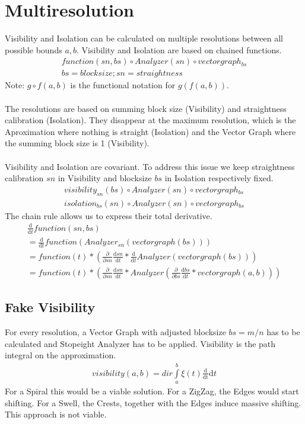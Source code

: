 \documentclass{report}
\begin{document}
\chapter{Multiresolution}
Visibility and Isolation can be calculated on multiple resolutions between all possible bounds $a,b$.
Visibility and Isolation are based on chained functions.
\begin{align*}
function(sn,bs) \circ Analyzer(sn) \circ vectorgraph_{bs}\\
bs=blocksize;sn=straightness
\end{align*}
Note: $g \circ f(a,b)$ is the functional notation for $g(f(a,b))$.\\\\
The resolutions are based on summing block size (Visibility) and straightness calibration (Isolation). They disappear at the maximum resolution, which is the Aproximation where nothing is straight (Isolation) and the Vector Graph where the summing block size is 1 (Visibility).\\\\
Visibility and Isolation are covariant. To address this issue we keep straightness calibration $sn$ in Visibility and blocksize $bs$ in Isolation respectively fixed.
\begin{align}
visibility_{sn}(bs) \circ Analyzer(sn) \circ vectorgraph_{bs}\\
isolation_{bs}(sn) \circ Analyzer(sn) \circ vectorgraph_{bs}
\end{align}
The chain rule allows us to express their total derivative.
\begin{align}
\frac{\mathrm{d}}{\mathrm{d} t} function (sn,bs)\\
= \frac{\mathrm{d}}{\mathrm{d} t} function (Analyzer_{sn}(vectorgraph(bs)))\\
= function(t)* (\frac{\partial}{\partial sn}  \frac{\mathrm{d} sn}{\mathrm{d}t} * \frac{\mathrm{d}}{\mathrm{d} t}Analyzer(vectorgraph(bs)))\\
= function(t)* (\frac{\partial}{\partial sn}  \frac{\mathrm{d} sn}{\mathrm{d}t} * Analyzer(\frac{\partial}{\partial bs} \frac{\mathrm{d} bs}{\mathrm{d}t}*vectorgraph(a,b)))
\end{align}

\section{Fake Visibility}
For every resolution, a Vector Graph with adjusted blocksize $bs=m/n$ has to be calculated and Stopeight Analyzer has to be applied.
Visibility is the path integral on the approximation.
\begin{align}
visibility(a,b)= dir \int \limits _{a}^{b} \xi(t)\frac{\mathrm{d}}{\mathrm{dt}} \mathrm{d}t
\end{align}
For a Spiral this would be a viable solution.
For a ZigZag, the Edges would start shifting.
For a Swell, the Crests, together with the Edges induce massive shifting.
This approach is not viable.
\end{document}
